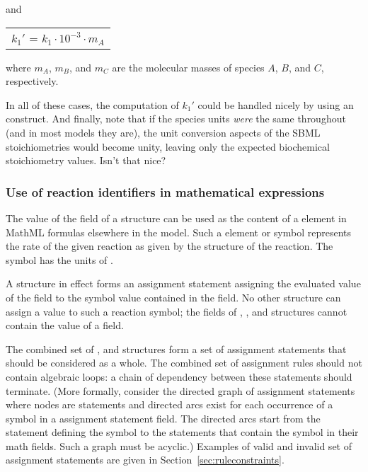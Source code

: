 and

\begin{tabular}{l}
  ${k_1}'$ = $k_1 \cdot 10^{-3} \cdot m_A$
\end{tabular}

where $m_A$, $m_B$, and $m_C$ are the molecular masses of species
$A$, $B$, and $C$, respectively.

In all of these cases, the computation of ${k_1}'$ could be
handled nicely by using an \InitialAssignment construct.  And
finally, note that if the species units \emph{were} the same
throughout (and in most models they are), the unit conversion
aspects of the SBML stoichiometries would become unity, leaving
only the expected biochemical stoichiometry values.  Isn't that
nice?


\subsubsection{Use of reaction identifiers in mathematical expressions}
\label{subsec:reaction-as-symbol}

The value of the  field of a \Reaction structure can be
used as the content of a  element in MathML formulas
elsewhere in the model. Such a  element or symbol
represents the rate of the given reaction as given by the
\KineticLaw structure of the reaction.  The symbol has the units
of .

A \KineticLaw structure in effect forms an assignment statement
assigning the evaluated value of the  field to the
symbol value contained in the \Reaction {} field.  No
other structure can assign a value to such a reaction symbol; \ie
the  fields of \InitialAssignment, \RateRule,
\AssignmentRule and \EventAssignment structures cannot contain the
value of a \Reaction {} field.

The combined set of \InitialAssignment, \AssignmentRule and
\KineticLaw structures form a set of assignment statements that
should be considered as a whole.  The combined set of assignment
rules should not contain algebraic loops: a chain of dependency
between these statements should terminate.  (More formally,
consider the directed graph of assignment statements where nodes
are statements and directed arcs exist for each occurrence of a
symbol in a assignment statement  field. The directed
arcs start from the statement defining the symbol to the
statements that contain the symbol in their math fields. Such a
graph must be acyclic.)  Examples of valid and invalid set of
assignment statements are given in
Section~\ref{sec:ruleconstraints}.


